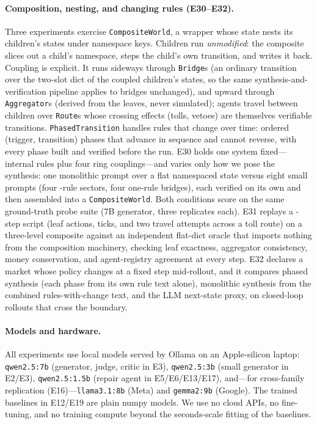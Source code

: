 \documentclass[11pt]{article}
\begin{document}
\paragraph{Composition, nesting, and changing rules (E30--E32).} Three
experiments exercise \texttt{CompositeWorld}, a wrapper whose state nests its
children's states under namespace keys. Children run \emph{unmodified}: the
composite slices out a child's namespace, steps the child's own transition,
and writes it back. Coupling is explicit. It runs sideways through
\texttt{Bridge}s (an ordinary transition over the two-slot dict of the coupled
children's states, so the same synthesis-and-verification pipeline applies to
bridges unchanged), and upward through \texttt{Aggregator}s (derived from the
leaves, never simulated); agents travel between children over \texttt{Route}s
whose crossing effects (tolls, vetoes) are themselves verifiable transitions.
\texttt{PhasedTransition} handles rules that change over time: ordered
(trigger, transition) phases that advance in sequence and cannot reverse,
with every phase built and verified before the run. E30 holds one system
fixed---\CompRules{} internal rules plus four ring couplings---and varies
only how we pose the synthesis: one monolithic prompt over a flat namespaced
state versus eight small prompts (four \CompChildRules-rule sectors, four
one-rule bridges), each verified on its own and then assembled into a
\texttt{CompositeWorld}. Both conditions score on the same ground-truth probe
suite (7B generator, three replicates each). E31 replays a \NestSteps-step
script (leaf actions, ticks, and two travel attempts across a toll route) on
a three-level composite against an independent flat-dict oracle that imports
nothing from the composition machinery, checking leaf exactness, aggregator
consistency, money conservation, and agent-registry agreement at every step.
E32 declares a market whose policy changes at a fixed step mid-rollout, and it
compares phased synthesis (each phase from its own rule text alone),
monolithic synthesis from the combined rules-with-change text, and the LLM
next-state proxy, on closed-loop rollouts that cross the boundary.

\paragraph{Models and hardware.} All experiments use local models served by
Ollama on an Apple-silicon laptop: \texttt{qwen2.5:7b} (generator, judge,
critic in E3), \texttt{qwen2.5:3b} (small generator in E2/E3),
\texttt{qwen2.5:1.5b} (repair agent in E5/E6/E13/E17), and---for
cross-family replication (E16)---\texttt{llama3.1:8b} (Meta) and
\texttt{gemma2:9b} (Google). The trained baselines in E12/E19 are plain
numpy models. We use no cloud APIs, no fine-tuning, and no training compute
beyond the seconds-scale fitting of the baselines.
\end{document}
